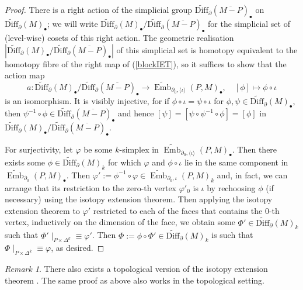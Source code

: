 \documentclass[a4paper, oneside]{amsart}
\newcommand{\bdiff}{\widetilde{\mathrm{Diff}}}
\newcommand{\bemb}{\widetilde{\operatorname{Emb}}}
\newcommand{\1}{\mathds{1}}
\theoremstyle{remark}
\newtheorem{rem}[thm]{Remark}%
\theoremstyle{definition}
\numberwithin{equation}{section}
\begin{document}
\begin{proof}
    There is a right action of the simplicial group $\bdiff_\partial(\overline{M-P})_\bullet$ on $\bdiff_\partial(M)_\bullet$; we will write $\bdiff_\partial(M)_\bullet/\bdiff_\partial(\overline{M-P})_\bullet$ for the simplicial set of (level-wise) cosets of this right action. The geometric realisation $|\bdiff_\partial(M)_\bullet/\bdiff_\partial(\overline{M-P})_\bullet|$ of this simplicial set is homotopy equivalent to the homotopy fibre of the right map of (\ref{blockIET}), so it suffices to show that the action map
    $$
a: \bdiff_\partial(M)_\bullet/\bdiff_\partial(\overline{M-P})_\bullet\longrightarrow \bemb_{\partial_0,\langle\iota\rangle}(P,M)_\bullet, \quad [\phi]\longmapsto \phi\circ \iota
    $$
    is an isomorphism. It is visibly injective, for if $\phi\circ\iota=\psi\circ\iota$ for $\phi,\psi\in \bdiff_\partial(M)_\bullet$, then $\psi^{-1}\circ\phi\in \bdiff_\partial(\overline{M-P})_\bullet$ and hence $[\psi]=[\psi\circ\psi^{-1}\circ\phi]=[\phi]$ in $\bdiff_\partial(M)_\bullet/\bdiff_\partial(\overline{M-P})_\bullet$.

    For surjectivity, let $\varphi$ be some $k$-simplex in $\bemb_{\partial_0,\langle\iota\rangle}(P,M)_\bullet$. Then there exists some $\phi\in \bdiff_\partial(M)_k$ for which   $\varphi$ and $\phi\circ\iota$ lie in the same component in $\bemb_{\partial_0}(P,M)_\bullet$. Then $\varphi':=\phi^{-1}\circ\varphi\in \bemb_{\partial_0,\iota}(P,M)_k$ and, in fact, we can arrange that its restriction to the zero-th vertex $\varphi'_0$ is $\iota$ by rechoosing $\phi$ (if necessary) using the isotopy extension theorem. Then applying the isotopy extension theorem to $\varphi'$ restricted to each of the faces that contains the $0$-th vertex, inductively on the dimension of the face, we obtain some $\Phi'\in \bdiff_\partial(M)_k$ such that $\Phi'\mid_{P\times \Delta^k}\equiv\varphi'$. Then $\Phi:=\phi\circ\Phi'\in \bdiff_\partial(M)_k$ is such that $\Phi\mid_{P\times \Delta^k}\equiv \varphi$, as desired.
\end{proof}

\begin{rem}\label{topIETrem}
    There also exists a topological version of the isotopy extension theorem \cite[Cor. 1.4]{TopIsotopyExtensionTheorem}. The same proof as above also works in the topological setting. 
\end{rem}
\end{document}
